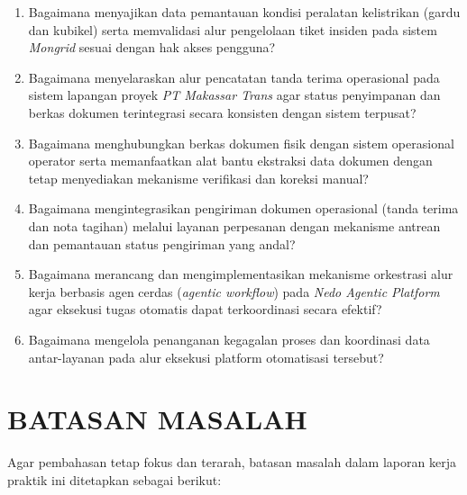 \begin{enumerate}[label=\alph*., leftmargin=*, itemsep=0pt]
  \item Bagaimana menyajikan data pemantauan kondisi peralatan kelistrikan (gardu dan kubikel) serta memvalidasi alur pengelolaan tiket insiden pada sistem \textit{Mongrid} sesuai dengan hak akses pengguna?
  \item Bagaimana menyelaraskan alur pencatatan tanda terima operasional pada sistem lapangan proyek \textit{PT Makassar Trans} agar status penyimpanan dan berkas dokumen terintegrasi secara konsisten dengan sistem terpusat?
  \item Bagaimana menghubungkan berkas dokumen fisik dengan sistem operasional operator serta memanfaatkan alat bantu ekstraksi data dokumen dengan tetap menyediakan mekanisme verifikasi dan koreksi manual?
  \item Bagaimana mengintegrasikan pengiriman dokumen operasional (tanda terima dan nota tagihan) melalui layanan perpesanan dengan mekanisme antrean dan pemantauan status pengiriman yang andal?
  \item Bagaimana merancang dan mengimplementasikan mekanisme orkestrasi alur kerja berbasis agen cerdas (\textit{agentic workflow}) pada \textit{Nedo Agentic Platform} agar eksekusi tugas otomatis dapat terkoordinasi secara efektif?
  \item Bagaimana mengelola penanganan kegagalan proses dan koordinasi data antar-layanan pada alur eksekusi platform otomatisasi tersebut?
\end{enumerate}

\section{BATASAN MASALAH}

Agar pembahasan tetap fokus dan terarah, batasan masalah dalam laporan kerja praktik ini ditetapkan sebagai berikut:

